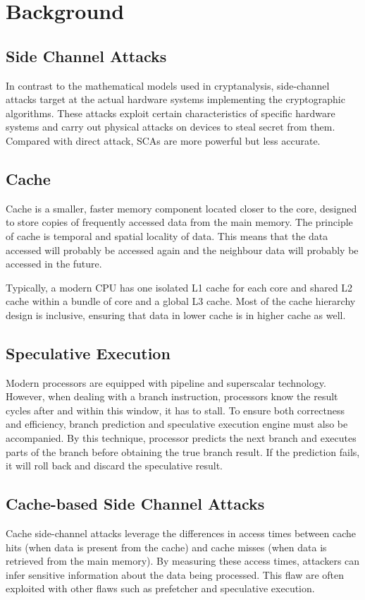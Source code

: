 \section{Background}

\subsection{Side Channel Attacks}

In contrast to the mathematical models used in cryptanalysis, side-channel attacks target at the actual hardware systems implementing the cryptographic algorithms. These attacks exploit certain characteristics of specific hardware systems and carry out physical attacks on devices to steal secret from them. Compared with direct attack, SCAs are more powerful but less accurate.

\subsection{Cache}
Cache is a smaller, faster memory component located closer to the core, designed to store copies of frequently accessed data from the main memory. The principle of cache is temporal and spatial locality of data. This means that the data accessed will probably be accessed again and the neighbour data will probably be accessed  in the future. 

Typically, a modern CPU has one isolated L1 cache for each core and shared L2 cache within a bundle of core and a global L3 cache. Most of the cache hierarchy design is inclusive, ensuring that data in lower cache is in higher cache as well.

\subsection{Speculative Execution}
Modern processors are equipped with pipeline and superscalar technology. However, when dealing with a branch instruction, processors know the result cycles after and within this window, it has to stall. To ensure both correctness and efficiency, branch prediction and speculative execution engine must also be accompanied. By this technique, processor predicts the next branch and executes parts of the branch before obtaining the true branch result. If the prediction fails, it will roll back and discard the speculative result.

\subsection{Cache-based Side Channel Attacks}
Cache side-channel attacks leverage the differences in access times between cache hits (when data is present from the cache) and cache misses (when data is retrieved from the main memory). By measuring these access times, attackers can infer sensitive information about the data being processed. This flaw are often exploited with other flaws such as prefetcher and speculative execution.

